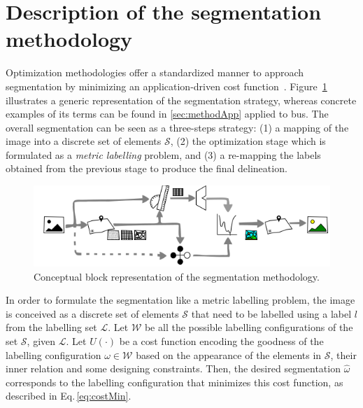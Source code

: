 \graphicspath{ {./content/method/figures/visual_cues/}{./content/method/figures/}}

\section{Description of the segmentation methodology}\label{sec:method}

Optimization methodologies offer a standardized manner to approach segmentation by minimizing an application-driven cost function~\cite{cremers2007review}.
Figure~\ref{fig:method} illustrates a generic representation of the segmentation strategy, whereas concrete examples of its terms can be found in \cref{sec:methodApp} applied to \ac{bus}.
The overall segmentation can be seen as a three-steps strategy: 
(1) a mapping of the image into a discrete set of elements $\mathcal{S}$, 
(2) the optimization stage which is formulated as a \emph{metric labelling} problem, 
and (3) a re-mapping the labels obtained from the previous stage to produce the final delineation. 

\begin{figure}[htpb]
  \centering
  \includegraphics[width=0.9\linewidth]{method}
  \caption{Conceptual block representation of the segmentation methodology.
  }
  \label{fig:method}
\end{figure}


In order to formulate the segmentation like a metric labelling problem, the image is conceived as a discrete set of elements $\mathcal{S}$ that need to be labelled using a label $l$ from the labelling set $\mathcal{L}$.
Let $\mathcal{W}$ be all the possible labelling configurations of the set $\mathcal{S}$, given $\mathcal{L}$.
Let $U(\cdot)$ be a cost function encoding the goodness of the labelling configuration $\omega \in \mathcal{W}$ based on the appearance of the elements in $\mathcal{S}$, their inner relation and some designing constraints.
Then, the desired segmentation $\hat{\omega}$ corresponds to the labelling configuration that minimizes this cost function, as described in Eq.\,\eqref{eq:costMin}.

